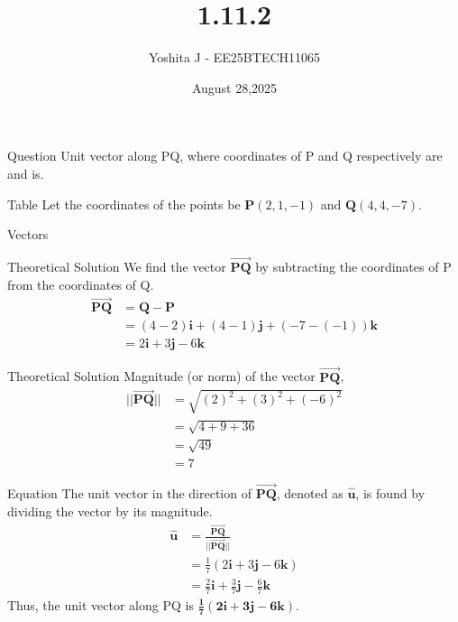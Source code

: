 \documentclass{beamer}
\begin{document}
\title 
{1.11.2}
\date{August 28,2025}


\author 
{Yoshita J - EE25BTECH11065}






\frame{\titlepage}
\begin{frame}{Question}
  Unit vector along PQ, where coordinates of P and Q respectively are  and  is.\\
\end{frame}



\begin{frame}{Table}
Let the coordinates of the points be $\mathbf{P}(2, 1, -1)$ and $\mathbf{Q}(4, 4, -7)$.
\begin{table}[H]    
  \centering
  
  \caption{Vectors}
  \label{Answers}
\end{table}
\end{frame}
\begin{frame}{Theoretical Solution}
We find the vector $\vec{\mathbf{PQ}}$ by subtracting the coordinates of P from the coordinates of Q.
\begin{align}
    \vec{\mathbf{PQ}} &= \mathbf{Q} - \mathbf{P} \\
    &= (4-2)\mathbf{i} + (4-1)\mathbf{j} + (-7 - (-1))\mathbf{k} \\
    &= 2\mathbf{i} + 3\mathbf{j} - 6\mathbf{k}
\end{align}
\end{frame}

\begin{frame}{Theoretical Solution}
Magnitude (or norm) of the vector $\vec{\mathbf{PQ}}$,
\begin{align}
    ||\vec{\mathbf{PQ}}|| &= \sqrt{(2)^2 + (3)^2 + (-6)^2} \\
    &= \sqrt{4 + 9 + 36} \\
    &= \sqrt{49} \\
    &= 7
\end{align}
\end{frame}
\begin{frame}{Equation}
The unit vector in the direction of $\vec{\mathbf{PQ}}$, denoted as $\mathbf{\hat{u}}$, is found by dividing the vector by its magnitude.
\begin{align}
    \mathbf{\hat{u}} &= \frac{\vec{\mathbf{PQ}}}{||\vec{\mathbf{PQ}}||} \\
    &= \frac{1}{7}(2\mathbf{i} + 3\mathbf{j} - 6\mathbf{k}) \\
    &= \frac{2}{7}\mathbf{i} + \frac{3}{7}\mathbf{j} - \frac{6}{7}\mathbf{k}
\end{align}
Thus, the unit vector along PQ is $\mathbf{\frac{1}{7}(2\mathbf{i} + 3\mathbf{j} - 6\mathbf{k})}$.
\end{frame}
\end{document}
